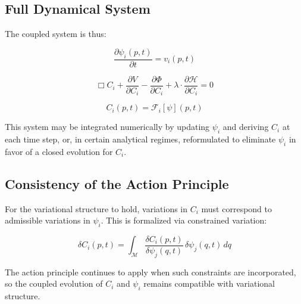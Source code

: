 \subsection{Full Dynamical System}

The coupled system is thus:

\begin{equation}
\frac{\partial \psi_i(p, t)}{\partial t} = v_i(p, t)
\end{equation}

\begin{equation}
\Box C_i + \frac{\partial V}{\partial C_i} - \frac{\partial \Phi}{\partial C_i} + \lambda \cdot \frac{\partial \mathcal{H}}{\partial C_i} = 0
\end{equation}

\begin{equation}
C_i(p, t) = \mathcal{F}_i[\psi](p, t)
\end{equation}

This system may be integrated numerically by updating \(\psi_i\) and deriving \(C_i\) at each time step, or, in certain analytical regimes, reformulated to eliminate \(\psi_i\) in favor of a closed evolution for \(C_i\).

\subsection{Consistency of the Action Principle}

For the variational structure to hold, variations in \(C_i\) must correspond to admissible variations in \(\psi_i\). This is formalized via constrained variation:

\begin{equation}
\delta C_i(p, t) = \int_{\mathcal{M}} \frac{\delta C_i(p, t)}{\delta \psi_j(q, t)} \, \delta \psi_j(q, t) \, dq
\end{equation}

The action principle continues to apply when such constraints are incorporated, so the coupled evolution of \(C_i\) and \(\psi_i\) remains compatible with variational structure.